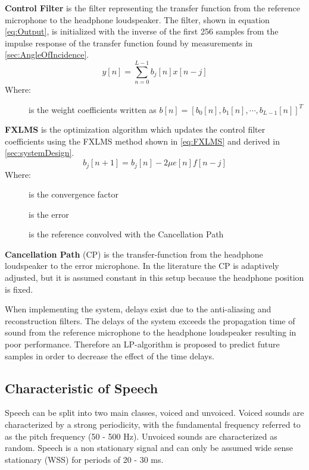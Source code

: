 \textbf{Control Filter} is the filter representing the transfer function from the reference microphone to the headphone loudspeaker. The filter, shown in equation \ref{eq:Output}, is initialized with the inverse of the first 256 samples from the impulse response of the transfer function found by measurements in \autoref{sec:AngleOfIncidence}.  
\vspace{-3mm} %
\begin{equation}\label{eq:Output}
y[n]=\sum_{n=0}^{L-1}b_j[n]x[n-j]
\end{equation}
Where:
\vspace{-7mm} %
\begin{description}
	\item[] is the weight coefficients written as  $b[n]=[b_0[n],b_1[n], \cdots, b_{L-1}[n]]^T$
\end{description}

\textbf{FXLMS} is the optimization algorithm which updates the control filter coefficients using the FXLMS method shown in \autoref{eq:FXLMS} and derived in \autoref{sec:systemDesign}. 
\begin{equation}\label{eq:FXLMS}
b_j[n+1] = b_j[n] - 2\mu e[n]f[n-j]
\end{equation}
Where:
\vspace{-8mm} %
\begin{description}
	\item[\text{$\mu$}] is the convergence factor
	\item[] is the error 
	\item[] is the reference convolved with the Cancellation Path
\end{description}

\textbf{Cancellation Path} (CP) is the transfer-function from the headphone loudspeaker to the error microphone. In the literature \cite{Hansen} the CP is adaptively adjusted, but it is assumed constant in this setup because the headphone position is fixed.     


When implementing the system, delays exist due to the anti-aliasing and reconstruction filters. The delays of the system exceeds the propagation time of sound from the reference microphone to the headphone loudspeaker resulting in poor performance. Therefore an LP-algorithm is proposed to predict future samples in order to decrease the effect of the time delays.

\subsection{Characteristic of Speech}
Speech can be split into two main classes, voiced and unvoiced. Voiced sounds are characterized by a strong periodicity, with the fundamental frequency referred to as the pitch frequency (50 - 500 Hz). Unvoiced sounds are characterized as random. Speech is a non stationary signal and can only be assumed wide sense stationary (WSS) for periods of 20 - 30 ms. 

